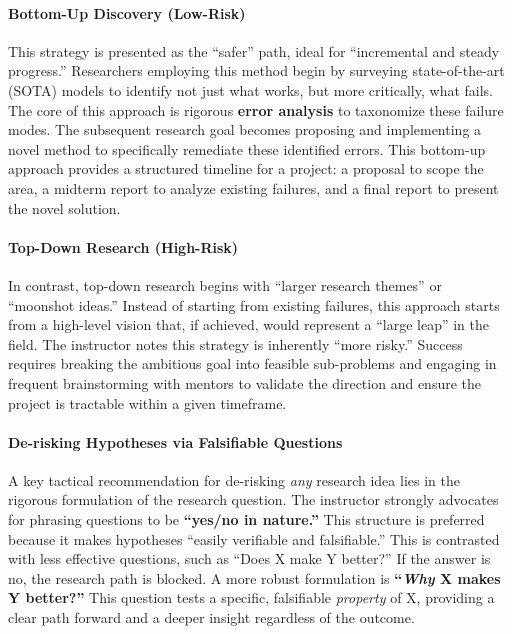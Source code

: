 \paragraph{Bottom-Up Discovery (Low-Risk)}
This strategy is presented as the ``safer'' path, ideal for ``incremental and steady progress.''
Researchers employing this method begin by surveying state-of-the-art (SOTA) models to identify not just what works, but more critically, what fails.
The core of this approach is rigorous \textbf{error analysis} to taxonomize these failure modes.
The subsequent research goal becomes proposing and implementing a novel method to specifically remediate these identified errors.
This bottom-up approach provides a structured timeline for a project: a proposal to scope the area, a midterm report to analyze existing failures, and a final report to present the novel solution.

\paragraph{Top-Down Research (High-Risk)}
In contrast, top-down research begins with ``larger research themes'' or ``moonshot ideas.''
Instead of starting from existing failures, this approach starts from a high-level vision that, if achieved, would represent a ``large leap'' in the field.
The instructor notes this strategy is inherently ``more risky.''
Success requires breaking the ambitious goal into feasible sub-problems and engaging in frequent brainstorming with mentors to validate the direction and ensure the project is tractable within a given timeframe.

\paragraph{De-risking Hypotheses via Falsifiable Questions}
A key tactical recommendation for de-risking \textit{any} research idea lies in the rigorous formulation of the research question.
The instructor strongly advocates for phrasing questions to be \textbf{``yes/no in nature.''}
This structure is preferred because it makes hypotheses ``easily verifiable and falsifiable.''
This is contrasted with less effective questions, such as ``Does X make Y better?''
If the answer is no, the research path is blocked.
A more robust formulation is \textbf{``\textit{Why} X makes Y better?''}
This question tests a specific, falsifiable \textit{property} of X, providing a clear path forward and a deeper insight regardless of the outcome.

